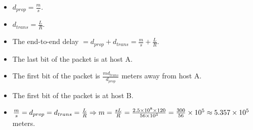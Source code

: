\begin{pr}$ $
\begin{itemize}
\item $d_{prop}=\frac ms$.
\item $d_{trans}=\frac LR$.
\item The end-to-end delay $=d_{prop}+d_{trans}=\frac ms+\frac LR$.
\item The last bit of the packet is at host A.
\item The first bit of the packet is $\frac{md_{trans}}{d_{prop}}$ meters away from host A.
\item The first bit of the packet is at host B.
\item $\frac ms=d_{prop}=d_{trans}=\frac LR\Rightarrow m=\frac{sL}R=\frac{2.5\times10^8\times120}{56\times10^3}=\frac{300}{56}\times10^5\approx5.357\times10^5$ meters.
\end{itemize}
\end{pr}
